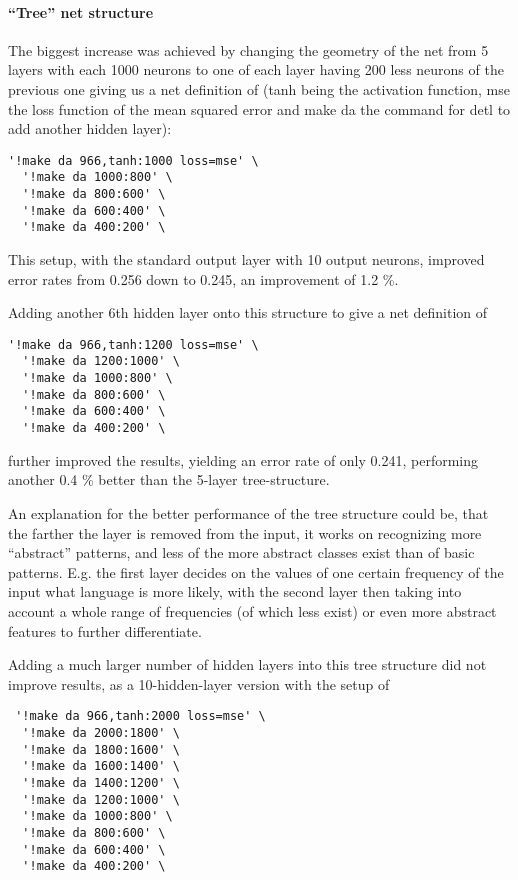 \paragraph{``Tree'' net structure} The biggest increase was achieved by changing the geometry of the net from 5 layers with each 1000 neurons to one of each layer having 200 less neurons of the previous one giving us a net definition of (tanh being the activation function, mse the loss function of the mean squared error and make da the command for detl to add another hidden layer):

\begin{verbatim}'!make da 966,tanh:1000 loss=mse' \
  '!make da 1000:800' \
  '!make da 800:600' \
  '!make da 600:400' \
  '!make da 400:200' \
\end{verbatim}

This setup, with the standard output layer with 10 output neurons, improved error rates from 0.256 down to 0.245, an improvement of 1.2 \%.

Adding another 6th hidden layer onto this structure to give a net definition of
\begin{verbatim}'!make da 966,tanh:1200 loss=mse' \
  '!make da 1200:1000' \
  '!make da 1000:800' \
  '!make da 800:600' \
  '!make da 600:400' \
  '!make da 400:200' \
\end{verbatim}

further improved the results, yielding an error rate of only 0.241, performing another 0.4 \% better than the 5-layer tree-structure. 

An explanation for the better performance of the tree structure could be, that the farther the layer is removed from the input, it works on recognizing more ``abstract'' patterns, and less of the more abstract classes exist than of basic patterns. E.g. the first layer decides on the values of one certain frequency of the input what language is more likely, with the second layer then taking into account a whole range of frequencies (of which less exist) or even more abstract features to further differentiate.

Adding a much larger number of hidden layers into this tree structure did not improve results, as a 10-hidden-layer version with the setup of

\begin{verbatim}
 '!make da 966,tanh:2000 loss=mse' \
  '!make da 2000:1800' \
  '!make da 1800:1600' \
  '!make da 1600:1400' \
  '!make da 1400:1200' \
  '!make da 1200:1000' \
  '!make da 1000:800' \
  '!make da 800:600' \
  '!make da 600:400' \
  '!make da 400:200' \
\end{verbatim}

